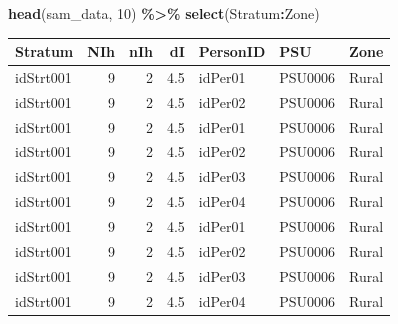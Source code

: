 \documentclass[
  spanish,
  12pt,
]{book}
\newenvironment{Shaded}{\begin{snugshade}}{\end{snugshade}}
\newcommand{\AttributeTok}[1]{\textcolor[rgb]{0.13,0.29,0.53}{#1}}
\newcommand{\DecValTok}[1]{\textcolor[rgb]{0.00,0.00,0.81}{#1}}
\newcommand{\FunctionTok}[1]{\textcolor[rgb]{0.13,0.29,0.53}{\textbf{#1}}}
\newcommand{\NormalTok}[1]{#1}
\newcommand{\OtherTok}[1]{\textcolor[rgb]{0.56,0.35,0.01}{#1}}
\newcommand{\SpecialCharTok}[1]{\textcolor[rgb]{0.81,0.36,0.00}{\textbf{#1}}}
\newcommand{\StringTok}[1]{\textcolor[rgb]{0.31,0.60,0.02}{#1}}
\begin{document}
\begin{Shaded}
\end{Shaded}

\begin{Shaded}
\begin{Highlighting}[]
\FunctionTok{head}\NormalTok{(sam\_data, }\DecValTok{10}\NormalTok{) }\SpecialCharTok{\%\textgreater{}\%} \FunctionTok{select}\NormalTok{(Stratum}\SpecialCharTok{:}\NormalTok{Zone)}
\end{Highlighting}
\end{Shaded}

\begin{tabular}{l|r|r|r|l|l|l}
\hline
Stratum & NIh & nIh & dI & PersonID & PSU & Zone\\
\hline
idStrt001 & 9 & 2 & 4.5 & idPer01 & PSU0006 & Rural\\
\hline
idStrt001 & 9 & 2 & 4.5 & idPer02 & PSU0006 & Rural\\
\hline
idStrt001 & 9 & 2 & 4.5 & idPer01 & PSU0006 & Rural\\
\hline
idStrt001 & 9 & 2 & 4.5 & idPer02 & PSU0006 & Rural\\
\hline
idStrt001 & 9 & 2 & 4.5 & idPer03 & PSU0006 & Rural\\
\hline
idStrt001 & 9 & 2 & 4.5 & idPer04 & PSU0006 & Rural\\
\hline
idStrt001 & 9 & 2 & 4.5 & idPer01 & PSU0006 & Rural\\
\hline
idStrt001 & 9 & 2 & 4.5 & idPer02 & PSU0006 & Rural\\
\hline
idStrt001 & 9 & 2 & 4.5 & idPer03 & PSU0006 & Rural\\
\hline
idStrt001 & 9 & 2 & 4.5 & idPer04 & PSU0006 & Rural\\
\hline
\end{tabular}
\end{document}
